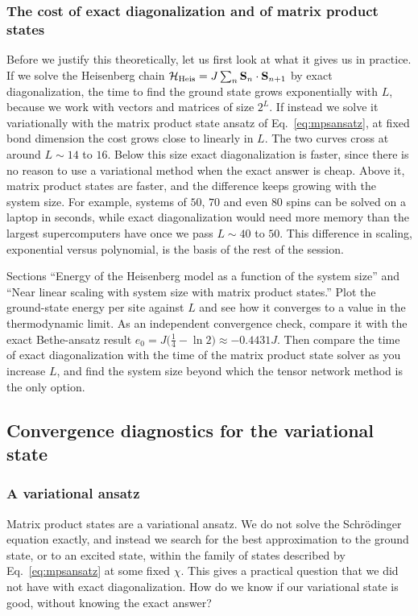 \documentclass[lecture_notes.tex]{subfiles}
\begin{document}
\subsubsection{The cost of exact diagonalization and of matrix product states}
Before we justify this theoretically, let us first look at what it gives us in practice. If we
solve the Heisenberg chain $\mathcal{H}_{\mathrm{Heis}} = J\sum_n \vb S_n\cdot\vb S_{n+1}$ by exact
diagonalization, the time to find the ground state grows exponentially with $L$, because we work
with vectors and matrices of size $2^L$. If instead we solve it variationally with the matrix
product state ansatz of Eq.~\eqref{eq:mpsansatz}, at fixed bond dimension the cost grows close to
linearly in $L$. The two curves cross at around $L\sim 14$ to $16$. Below this size exact
diagonalization is faster, since there is no reason to use a variational method when the exact
answer is cheap. Above it, matrix product states are faster, and the difference keeps growing with
the system size. For example, systems of $50$, $70$ and even $80$ spins can be solved on a laptop
in seconds, while exact diagonalization would need more memory than the largest supercomputers
have once we pass $L\sim 40$ to $50$. This difference in scaling, exponential versus polynomial,
is the basis of the rest of the session.

\begin{notebook}
Sections ``Energy of the Heisenberg model as a function of the system size'' and ``Near linear
scaling with system size with matrix product states.'' Plot the ground-state energy per site
against $L$ and see how it converges to a value in the thermodynamic limit. As an independent
convergence check, compare it with the exact Bethe-ansatz result
$e_0 = J\big(\tfrac14-\ln2\big)\approx-0.4431J$. Then compare the time of exact diagonalization
with the time of the matrix product state solver as you increase $L$, and find the system size
beyond which the tensor network method is the only option.
\end{notebook}

\subsection{Convergence diagnostics for the variational state}
\subsubsection{A variational ansatz}
Matrix product states are a variational ansatz. We do not solve the Schr\"odinger equation
exactly, and instead we search for the best approximation to the ground state, or to an excited
state, within the family of states described by Eq.~\eqref{eq:mpsansatz} at some fixed $\chi$.
This gives a practical question that we did not have with exact diagonalization. How do we know if
our variational state is good, without knowing the exact answer?
\end{document}
